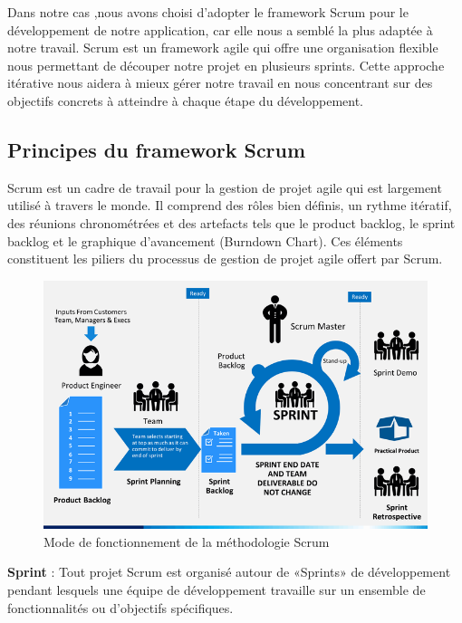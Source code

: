 Dans notre cas ,nous avons choisi d'adopter le framework Scrum pour le développement de notre application, car elle nous a semblé la plus adaptée à notre travail. Scrum est un framework agile qui offre une organisation flexible nous permettant de découper notre projet en plusieurs sprints. Cette approche itérative nous aidera à mieux gérer notre travail en nous concentrant sur des objectifs concrets à atteindre à chaque étape du développement.




\newpage
\subsection{ Principes du framework Scrum}
Scrum est un cadre de travail pour la gestion de projet agile qui est largement utilisé à travers le monde. Il comprend des rôles bien définis, un rythme itératif, des réunions chronométrées et des artefacts tels que le product backlog, le sprint backlog et le graphique d'avancement (Burndown Chart). Ces éléments constituent les piliers du processus de gestion de projet agile offert par Scrum.\\

\begin{figure}[htbp]
    \centering
    \includegraphics[width=1\textwidth]{chap1.images/scrum-process-slide2_2.png}
    \caption{Mode de fonctionnement de la méthodologie Scrum}
\end{figure}

\noindent\textbf{Sprint} : Tout projet Scrum est organisé autour de «Sprints» de développement pendant lesquels une équipe de développement travaille sur un ensemble de fonctionnalités ou d'objectifs spécifiques.

